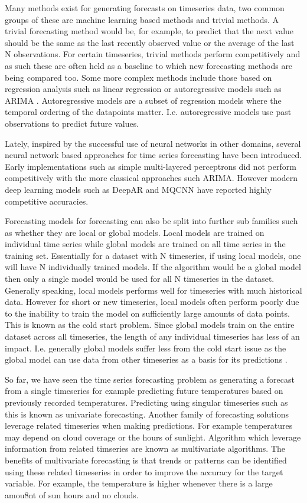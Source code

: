 Many methods exist for generating forecasts on timeseries data, two common groups of these are machine learning based methods and trivial methods. A trivial forecasting method would be, for example, to predict that the next value should be the same as the last recently observed value or the average of the last N observations. For certain timeseries, trivial methods perform competitively and as such these are often held as a baseline to which new forecasting methods are being compared too. Some more complex methods include those based on regression analysis such as linear regression or autoregressive models such as ARIMA \cite{hyndman_forecasting_3rd}. Autoregressive models are a subset of regression models where the temporal ordering of the datapoints matter. I.e. autoregressive models use past observations to predict future values. 

Lately, inspired by the successful use of neural networks in other domains, several neural network based approaches for time series forecasting have been introduced. Early implementations such as simple multi-layered perceptrons did not perform competitively with the more classical approaches such ARIMA. However modern deep learning models such as DeepAR \cite{salinas_deepar_2019} and MQCNN \cite{wen_multi-horizon_2018} have reported highly competitive accuracies.

Forecasting models for forecasting can also be split into further sub families such as whether they are local or global models. Local models are trained on individual time series while global models are trained on all time series in the training set. Essentially for a dataset with N timeseries, if using local models, one will have N individually trained models. If the algorithm would be a global model then only a single model would be used for all N timeseries in the dataset. Generally speaking, local models performs well for timeseries with much historical data. However for short or new timeseries, local models often perform poorly due to the inability to train the model on sufficiently large amounts of data points. This is known as the cold start problem. Since global models train on the entire dataset across all timeseries, the length of any individual timeseries has less of an impact. I.e. generally global models suffer less from the cold start issue as the global model can use data from other timeseries as a basis for its predictions \cite{wang_deep_2019}. 

So far, we have seen the time series forecasting problem as generating a forecast from a single timeseries for example predicting future temperatures based on previously recorded temperatures. Predicting using singular timeseries such as this is known as univariate forecasting. Another family of forecasting solutions leverage related timeseries when making predictions. For example temperatures may depend on cloud coverage or the hours of sunlight. Algorithm which leverage information from related timseries are known as multivariate algorithms. The benefits of multivariate forecasting is that trends or patterns can be identified using these related timeseries in order to improve the accuracy for the target variable. For example, the temperature is higher whenever there is a large amou8nt of sun hours and no clouds.

